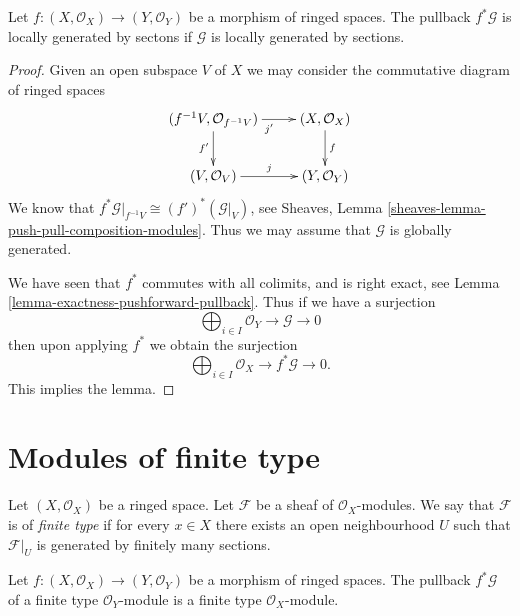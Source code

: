 \begin{lemma}
\label{lemma-pullback-locally-generated}
Let $f : (X, \mathcal{O}_X) \to (Y, \mathcal{O}_Y)$
be a morphism of ringed spaces.
The pullback $f^*\mathcal{G}$ is locally generated by sectons
if $\mathcal{G}$ is locally generated by sections.
\end{lemma}

\begin{proof}
Given an open subspace $V$ of $X$ we may
consider the commutative diagram of ringed spaces
$$
\xymatrix{
(f^{-1}V, \mathcal{O}_{f^{-1}V}) \ar[r]_{j'} \ar[d]_{f'} &
(X, \mathcal{O}_X) \ar[d]^f \\
(V, \mathcal{O}_V) \ar[r]^j &
(Y, \mathcal{O}_Y)
}
$$
We know that $f^*\mathcal{G}|_{f^{-1}V} \cong (f')^*(\mathcal{G}|_V)$,
see Sheaves, Lemma \ref{sheaves-lemma-push-pull-composition-modules}.
Thus we may assume that $\mathcal{G}$ is globally generated.

\medskip\noindent
We have seen that $f^*$ commutes with all colimits,
and is right exact, see Lemma \ref{lemma-exactness-pushforward-pullback}.
Thus if we have a surjection
$$
\bigoplus\nolimits_{i \in I}
\mathcal{O}_Y
\to
\mathcal{G}
\to
0
$$
then upon applying $f^*$ we obtain the surjection
$$
\bigoplus\nolimits_{i \in I}
\mathcal{O}_X
\to
f^*\mathcal{G}
\to
0.
$$
This implies the lemma.
\end{proof}












\section{Modules of finite type}
\label{section-finite-type}

\begin{definition}
\label{definition-finite-type}
Let $(X, \mathcal{O}_X)$ be a ringed space.
Let $\mathcal{F}$ be a sheaf of $\mathcal{O}_X$-modules.
We say that $\mathcal{F}$ is of {\it finite type}
if for every $x \in X$ there exists an open
neighbourhood $U$ such that $\mathcal{F}|_U$
is generated by finitely many sections.
\end{definition}

\begin{lemma}
\label{lemma-pullback-finite-type}
Let $f : (X, \mathcal{O}_X) \to (Y, \mathcal{O}_Y)$
be a morphism of ringed spaces.
The pullback $f^*\mathcal{G}$ of a finite type
$\mathcal{O}_Y$-module is a finite type $\mathcal{O}_X$-module.
\end{lemma}

